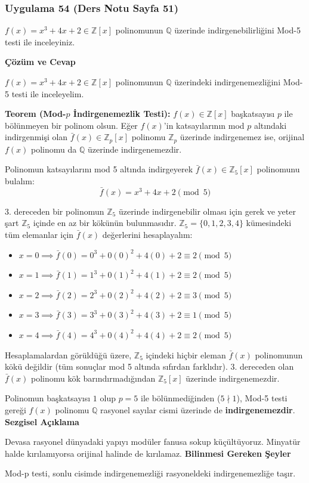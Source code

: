 \documentclass[11pt, a4paper]{article}
\newenvironment{cozum}{
    \vspace{0.5cm}
    \noindent\textcolor{green!60!black}{\faCheckCircle\enspace \textbf{\Large Çözüm ve Cevap}}\par\vspace{0.2cm}
}{}
\newenvironment{sezgisel}{
    \vspace{0.5cm}
    \noindent\textcolor{orange!80!black}{\faLightbulb\enspace \textbf{\Large Sezgisel Açıklama}}\par\vspace{0.2cm}
    \itshape
}{}
\newenvironment{bilgi}{
    \vspace{0.5cm}
    \noindent\textcolor{red!70!black}{\faExclamationTriangle\enspace \textbf{\Large Bilinmesi Gereken Şeyler}}\par\vspace{0.2cm}
}{}
\begin{document}
\newpage
\subsubsection{Uygulama 54 (Ders Notu Sayfa 51)}
\begin{sorubox}
$f(x)=x^3+4x+2 \in \mathbb{Z}[x]$ polinomunun $\mathbb{Q}$ üzerinde indirgenebilirliğini Mod-5 testi ile inceleyiniz.
\end{sorubox}
\begin{cozum}
$f(x) = x^{3} + 4x + 2 \in \mathbb{Z}[x]$ polinomunun $\mathbb{Q}$ üzerindeki indirgenemezliğini Mod-5 testi ile inceleyelim.

\textbf{Teorem (Mod-$p$ İndirgenemezlik Testi):} $f(x) \in \mathbb{Z}[x]$ başkatsayısı $p$ ile bölünmeyen bir polinom olsun. Eğer $f(x)$'in katsayılarının mod $p$ altındaki indirgenmişi olan $\bar{f}(x) \in \mathbb{Z}_p[x]$ polinomu $\mathbb{Z}_p$ üzerinde indirgenemez ise, orijinal $f(x)$ polinomu da $\mathbb{Q}$ üzerinde indirgenemezdir.

Polinomun katsayılarını mod 5 altında indirgeyerek $\bar{f}(x) \in \mathbb{Z}_{5}[x]$ polinomunu bulalım:
\[ \bar{f}(x) = x^{3} + 4x + 2 \pmod{5} \]

3. dereceden bir polinomun $\mathbb{Z}_{5}$ üzerinde indirgenebilir olması için gerek ve yeter şart $\mathbb{Z}_{5}$ içinde en az bir kökünün bulunmasıdır. $\mathbb{Z}_{5} = \{0, 1, 2, 3, 4\}$ kümesindeki tüm elemanlar için $\bar{f}(x)$ değerlerini hesaplayalım:
\begin{itemize}
    \item $x = 0 \implies \bar{f}(0) = 0^3 + 0(0)^2 + 4(0) + 2 \equiv 2 \pmod{5}$
    \item $x = 1 \implies \bar{f}(1) = 1^3 + 0(1)^2 + 4(1) + 2 \equiv 2 \pmod{5}$
    \item $x = 2 \implies \bar{f}(2) = 2^3 + 0(2)^2 + 4(2) + 2 \equiv 3 \pmod{5}$
    \item $x = 3 \implies \bar{f}(3) = 3^3 + 0(3)^2 + 4(3) + 2 \equiv 1 \pmod{5}$
    \item $x = 4 \implies \bar{f}(4) = 4^3 + 0(4)^2 + 4(4) + 2 \equiv 2 \pmod{5}$
\end{itemize}

Hesaplamalardan görüldüğü üzere, $\mathbb{Z}_{5}$ içindeki hiçbir eleman $\bar{f}(x)$ polinomunun kökü değildir (tüm sonuçlar mod 5 altında sıfırdan farklıdır). 3. dereceden olan $\bar{f}(x)$ polinomu kök barındırmadığından $\mathbb{Z}_{5}[x]$ üzerinde indirgenemezdir.

Polinomun başkatsayısı $1$ olup $p = 5$ ile bölünmediğinden ($5 \nmid 1$), Mod-5 testi gereği $f(x)$ polinomu $\mathbb{Q}$ rasyonel sayılar cismi üzerinde de \textbf{indirgenemezdir}.
\end{cozum}
\begin{sezgisel}
Devasa rasyonel dünyadaki yapıyı modüler fanusa sokup küçültüyoruz. Minyatür halde kırılamıyorsa orijinal halinde de kırılamaz.
\end{sezgisel}
\begin{bilgi}
Mod-p testi, sonlu cisimde indirgenemezliği rasyoneldeki indirgenemezliğe taşır.
\end{bilgi}
\end{document}
